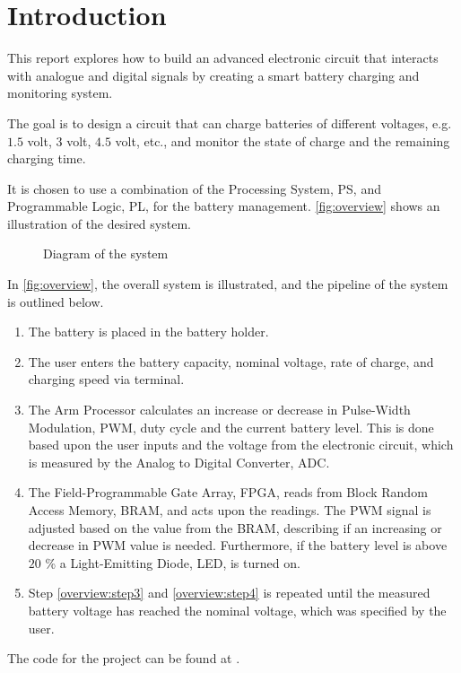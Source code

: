 \documentclass[../report.tex]{subfiles}
\begin{document}
\section{Introduction} \label{sec:introduction}
This report explores how to build an advanced electronic circuit that interacts with analogue and digital signals by creating a smart battery charging and monitoring system.

The goal is to design a circuit that can charge batteries of different voltages, e.g. $1.5$ volt, $3$ volt, $4.5$ volt, etc., and monitor the state of charge and the remaining charging time.

It is chosen to use a combination of the Processing System, PS, and Programmable Logic, PL, for the battery management. \autoref{fig:overview} shows an illustration of the desired system.

\begin{figure}[H]
    \centering
    \noindent\makebox[\textwidth][c]{}
    \caption{Diagram of the system}
    \label{fig:overview}
\end{figure}

In \autoref{fig:overview}, the overall system is illustrated, and the pipeline of the system is outlined below.
\begin{enumerate}
    \item \label{overview:step1} The battery is placed in the battery holder.
    \item \label{overview:step2} The user enters the battery capacity, nominal voltage, rate of charge, and charging speed via terminal.
    \item \label{overview:step3} The Arm Processor calculates an increase or decrease in Pulse-Width Modulation, PWM, duty cycle and the current battery level. This is done based upon the user inputs and the voltage from the electronic circuit, which is measured by the Analog to Digital Converter, ADC.
    \item \label{overview:step4} The Field-Programmable Gate Array, FPGA, reads from Block Random Access Memory, BRAM, and acts upon the readings. The PWM signal is adjusted based on the value from the BRAM, describing if an increasing or decrease in PWM value is needed. Furthermore, if the battery level is above $20$ \% a Light-Emitting Diode, LED, is turned on.
    \item \label{overview:step5} Step \ref{overview:step3} and \ref{overview:step4} is repeated until the measured battery voltage has reached the nominal voltage, which was specified by the user.
\end{enumerate}

The code for the project can be found at \cite{code}.
\end{document}
